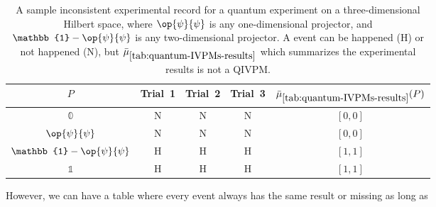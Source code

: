 \documentclass[english,reprint, aps, prl,superscriptaddress, showpacs,
showkeys, longbibliography, amsmath, amssymb, floatfix]{revtex4-1}
\theoremstyle{plain}
\theoremstyle{definition}
\newcommand{\imposs}{\ensuremath{\left[0,0\right]}}
\newcommand{\necess}{\ensuremath{\left[1,1\right]}}
\newcommand{\proj}[1]{\op{#1}{#1}}
\newcommand{\happen}{\text{H}}
\newcommand{\notHappen}{\text{N}}
\begin{document}
\begin{table}
\noindent \centering{}\caption{\label{tab:quantum-IVPMs-results}A sample inconsistent experimental
record for a quantum experiment on a three-dimensional Hilbert space,
where $\proj{\psi}$ is any one-dimensional projector, and $\mathbb{1}-\proj{\psi}$
is any two-dimensional projector. A event can be happened ($\happen$)
or not happened ($\notHappen$), but $\bar{\mu}_{\ref{tab:quantum-IVPMs-results}}$
which summarizes the experimental results is not a QIVPM.}
\begin{tabular}{ccccc}
\toprule 
\addlinespace
$P$  & Trial~1 & Trial~2 & Trial~3 & $\bar{\mu}_{\ref{tab:quantum-IVPMs-results}}(P)$\tabularnewline
\midrule
\midrule 
\addlinespace
$\mathbb{0}$  & $\notHappen$ & $\notHappen$ & $\notHappen$ & $\imposs$\tabularnewline
\midrule 
\addlinespace
$\proj{\psi}$  & $\notHappen$ & $\notHappen$ & $\notHappen$ & $\imposs$\tabularnewline
\midrule 
\addlinespace
$\mathbb{1}-\proj{\psi}$  & $\happen$ & $\happen$ & $\happen$ & $\necess$\tabularnewline
\midrule 
\addlinespace
$\mathbb{1}$  & $\happen$ & $\happen$ & $\happen$ & $\necess$\tabularnewline
\bottomrule
\end{tabular}
\end{table}
However, we can have a table where every event always has the same
result or missing as long as 


\end{document}
